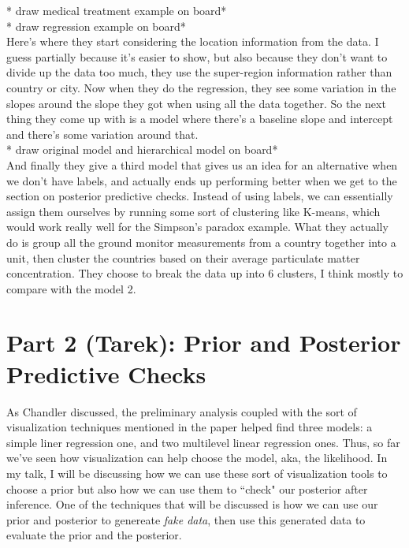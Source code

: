 \documentclass[]{article}
\begin{document}
* draw medical treatment example on board*
\\

* draw regression example on board*
\\

Here's where they start considering the location information from the data. I guess partially because it's easier to show, but also because they don't want to divide up the data too much, they use the super-region information rather than country or city. Now when they do the regression, they see some variation in the slopes around the slope they got when using all the data together. So the next thing they come up with is a model where there's a baseline slope and intercept and there's some variation around that.
\\

* draw original model and hierarchical model on board*
\\

And finally they give a third model that gives us an idea for an alternative when we don't have labels, and actually ends up performing better when we get to the section on posterior predictive checks. Instead of using labels, we can essentially assign them ourselves by running some sort of clustering like K-means, which would work really well for the Simpson's paradox example. What they actually do is group all the ground monitor measurements from a country together into a unit, then cluster the countries based on their average particulate matter concentration. They choose to break the data up into 6 clusters, I think mostly to compare with the model 2.


\section*{Part 2 (Tarek): Prior and Posterior Predictive Checks}
As Chandler discussed, the preliminary analysis coupled with the sort of visualization techniques mentioned in the paper helped find three models: a simple liner regression one, and two multilevel linear regression ones. Thus, so far we've seen how visualization can help choose the model, aka, the likelihood. In my talk, I will be discussing how we can use these sort of visualization tools to choose a prior but also how we can use them to ``check" our posterior after inference. One of the techniques that will be discussed is how we can use our prior and posterior to genereate \emph{fake data}, then use this generated data to evaluate the prior and the posterior. 
\end{document}
